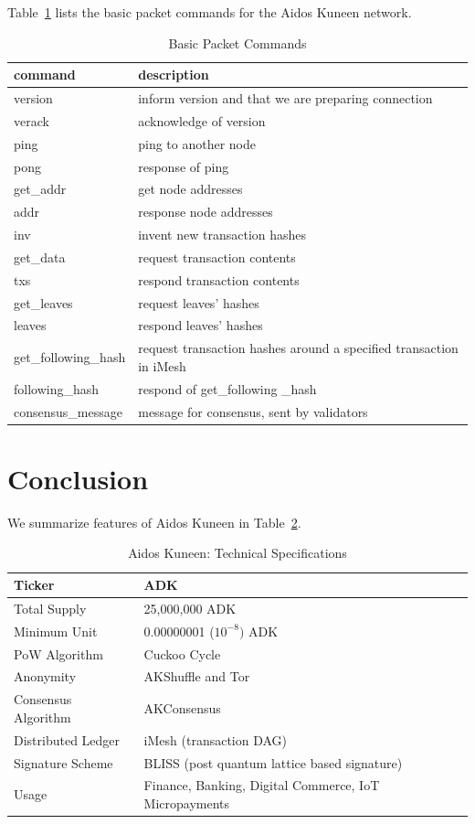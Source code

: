 \documentclass[a4paper,10pt,twocolumn]{article}
\begin{document}
	Table~\ref{tbl:cmd} lists the basic packet commands for the Aidos Kuneen network.
	
	 \begin{table}[htb]
		\caption{Basic Packet Commands}
		\label{tbl:cmd}
		\begin{tabularx}{\linewidth}{XX} 
			command & description \\
			\toprule
			version & inform version and that we are preparing connection \\
			verack & acknowledge of version \\
	  ping & ping to another node \\
	  pong & response of ping \\
	  get\_addr & get node addresses\\
	  addr & response node addresses \\
	  inv &  invent new transaction hashes \\
	  get\_data & request transaction contents \\
	  txs & respond transaction contents \\
	  get\_leaves & request  leaves' hashes \\
	  leaves &  respond leaves' hashes \\
	  get\_following\_hash &  request transaction hashes around a specified transaction in iMesh\\
	  following\_hash &  respond of get\_following \_hash \\
	  consensus\_message & message for consensus, sent by validators \\
	  \bottomrule
	\end{tabularx}
	  \end{table}

	  \section{Conclusion}
	  We summarize features of Aidos Kuneen in Table~\ref{tbl:spec}.
  	
	\begin{table}[htb]
		\caption{Aidos Kuneen: Technical Specifications}
		\label{tbl:spec}
		\begin{tabularx}{\linewidth}{XX} 
			\toprule
			Ticker & ADK \\
			\midrule
	Total Supply & 25,000,000 ADK \\ 
	\midrule
	Minimum Unit & 0.00000001 (\(10^{-8})\) ADK \\ 
	\midrule
	PoW Algorithm & Cuckoo Cycle\\ 
	\midrule
	Anonymity & AKShuffle and Tor \\
	\midrule
	Consensus Algorithm & AKConsensus \\ \midrule
	Distributed Ledger & iMesh (transaction DAG) \\
	\midrule
	Signature Scheme & BLISS (post quantum lattice based signature)\\ 
	\midrule
	Usage &  Finance, Banking, Digital Commerce, IoT Micropayments \\ 
	\bottomrule
	\end{tabularx}
	  \end{table}
	
\end{document}
